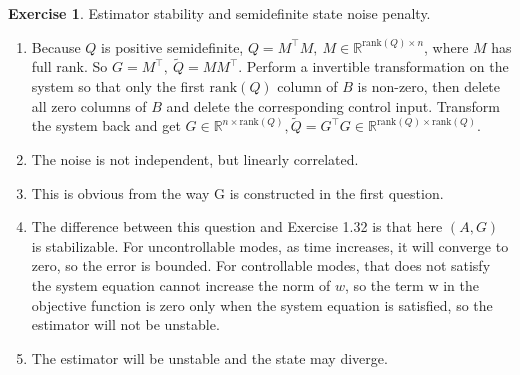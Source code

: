 \documentclass[11pt,a4paper]{report}
\theoremstyle{definition}\newtheorem{exercise}{Exercise}[chapter]
\begin{document}
\begin{exercise}Estimator stability and semidefinite state noise penalty.\\
\end{exercise}
\begin{answer}
\begin{enumerate}[label=(\alph*)]
    \item Because $Q$ is positive semidefinite, $Q=M^\top M,~M\in \mathbb{R}^{\text{rank}(Q)\times n}$, where $M$ has full rank. So $G=M^\top,~\tilde Q=MM^\top$.
    Perform a invertible transformation on the system so that only the first $\text{rank}(Q)$ column of $B$ is non-zero, then delete all zero columns of $B$ and delete the corresponding control input. Transform the system back and get $G\in \mathbb{R}^{n\times \text{rank}(Q)},\tilde Q=G^\top G\in \mathbb{R}^{\text{rank}(Q)\times \text{rank}(Q)}$.
    \item The noise is not independent, but linearly correlated.
    \item This is obvious from the way G is constructed in the first question.
    \item The difference between this question and Exercise 1.32 is that here $(A,G)$ is stabilizable. For uncontrollable modes, as time increases, it will converge to zero, so the error is bounded. For controllable modes, that does not satisfy the system equation cannot increase the norm of $w$, so the term w in the objective function is zero only when the system equation is satisfied, so the estimator will not be unstable.
    \item The estimator will be unstable and the state may diverge.
\end{enumerate}
\end{answer}
\end{document}
